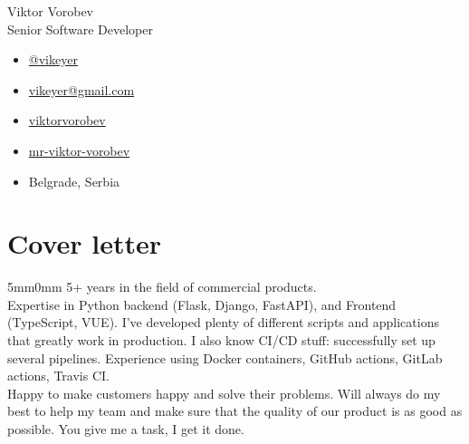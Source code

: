 \documentclass[10pt]{article}
\newcommand{\lmvalue}{5mm}
\newcommand{\rmvalue}{0mm}
\begin{document}
    \begin{minipage}[b]{0.78\linewidth}
    {\fontsize{28pt}{28pt}\selectfont Viktor Vorobev}
        \\[1em]
        {\color{gray}\fontsize{16pt}{16pt}\selectfont Senior Software Developer}
    \end{minipage}
    \hfill%
    \begin{minipage}[b]{0.24\linewidth}
        \begin{flushleft}
            \begin{itemize}
                \item[\color{cyan}\faPaperPlane] \href{https://t.me/vikeyer}{@vikeyer}
                \item[\color{cyan}\faEnvelope] \href{mailto:vikeyer@gmail.com}{vikeyer@gmail.com}
                \item[\color{cyan}\faGithub] \href{https://github.com/viktorvorobev}{viktorvorobev}
                \item[\color{cyan}\faLinkedin] \href{https://www.linkedin.com/in/mr-viktor-vorobev/}{mr-viktor-vorobev}
                \item[\faBuildingO] Belgrade, Serbia
            \end{itemize}
        \end{flushleft}
    \end{minipage}
    \vspace{3mm}
    \section*{Cover letter}
    \begin{changemargin}{\lmvalue}{\rmvalue}
        5+ years in the field of commercial products. \\
        Expertise in Python backend (Flask, Django, FastAPI), and Frontend (TypeScript, VUE).
        I've developed plenty of different scripts and applications that greatly work in production. 
        I also know CI/CD stuff: successfully set up several pipelines. 
        Experience using Docker containers, GitHub actions, GitLab actions, Travis CI. \\
        Happy to make customers happy and solve their problems. 
        Will always do my best to help my team and make sure that the quality of our product is as good as possible. 
        You give me a task, I get it done.        
    \end{changemargin}
\end{document}

